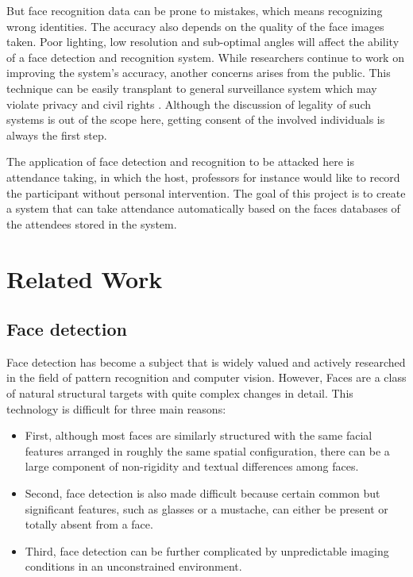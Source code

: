 \documentclass[conference]{IEEEtran}
\begin{document}
But face recognition data can be prone to mistakes, which means recognizing wrong identities\cite{b1}. The accuracy also depends on the quality of the face images taken. Poor lighting, low resolution and sub-optimal angles will affect the ability of a face detection and recognition system. While researchers continue to work on improving the system's accuracy, another concerns arises from the public. This technique can be easily transplant to general surveillance system which may violate privacy and civil rights \cite{b2}. Although the discussion of legality of such systems is out of the scope here, getting consent of the involved individuals is always the first step.

The application of face detection and recognition to be attacked here is attendance taking, in which the host, professors for instance would like to record the participant without personal intervention. The goal of this project is to create a system that can take attendance automatically based on the faces databases of the attendees stored in the system. 


\section{Related Work}

\subsection{Face detection}
\label{AA}
Face detection has become a subject that is widely valued and actively researched in the field of pattern recognition and computer vision. However, Faces are a class of natural structural targets with quite complex changes in detail. This technology is difficult for three main reasons:\cite{b3}
\begin{itemize}
\item First, although most faces are similarly structured with the same facial features arranged in roughly the same spatial configuration, there can be a large component of non-rigidity and textual differences among faces.
\item Second, face detection is also made difficult because certain common but significant features, such as glasses or a mustache, can either be present or totally absent from a face.
\item Third, face detection can be further complicated by unpredictable imaging conditions in an unconstrained environment. 
\end{itemize}
\end{document}

